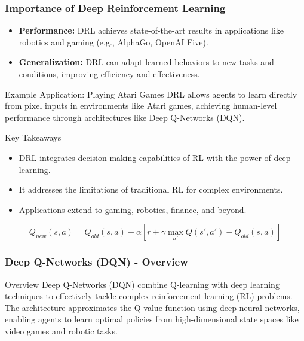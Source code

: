 \documentclass{beamer}
\begin{document}
\begin{frame}[fragile]
    \frametitle{Importance of Deep Reinforcement Learning}
    \begin{itemize}
        \item \textbf{Performance:} DRL achieves state-of-the-art results in applications like robotics and gaming (e.g., AlphaGo, OpenAI Five).
        \item \textbf{Generalization:} DRL can adapt learned behaviors to new tasks and conditions, improving efficiency and effectiveness.
    \end{itemize}
    
    \begin{block}{Example Application: Playing Atari Games}
        DRL allows agents to learn directly from pixel inputs in environments like Atari games, achieving human-level performance through architectures like Deep Q-Networks (DQN).
    \end{block}
    
    \begin{block}{Key Takeaways}
        \begin{itemize}
            \item DRL integrates decision-making capabilities of RL with the power of deep learning.
            \item It addresses the limitations of traditional RL for complex environments.
            \item Applications extend to gaming, robotics, finance, and beyond.
        \end{itemize}
    \end{block}
    
    \begin{equation}
        Q_{new}(s, a) = Q_{old}(s, a) + \alpha \left[r + \gamma \max_{a'} Q(s', a') - Q_{old}(s, a)\right]
    \end{equation}
\end{frame}

\begin{frame}[fragile]
    \frametitle{Deep Q-Networks (DQN) - Overview}
    \begin{block}{Overview}
        Deep Q-Networks (DQN) combine Q-learning with deep learning techniques 
        to effectively tackle complex reinforcement learning (RL) problems. 
        The architecture approximates the Q-value function using deep neural 
        networks, enabling agents to learn optimal policies from high-dimensional 
        state spaces like video games and robotic tasks.
    \end{block}
\end{frame}
\end{document}

